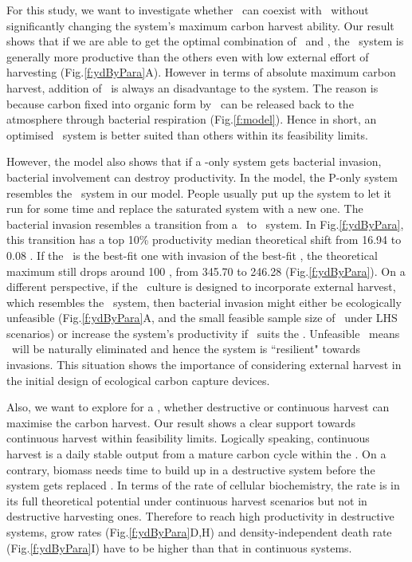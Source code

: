 \documentclass[../thesis.tex]{subfiles} %
\begin{document}
For this study, we want to investigate whether \bac\ can coexist with \phy\ without significantly changing the system’s maximum carbon harvest ability.  Our result shows that if we are able to get the optimal combination of \phy\ and \bac, the \PBH\ system is generally more productive than the others even with low external effort of harvesting (Fig.\ref{f:ydByPara}A).  However in terms of absolute maximum carbon harvest, addition of \bac\ is always an disadvantage to the system.  The reason is because carbon fixed into organic form by \phy\ can be released back to the atmosphere through bacterial respiration (Fig.\ref{f:model}).  Hence in short, an optimised \PBH\ system is better suited than others within its feasibility limits.

However, the model also shows that if a \phy-only system gets bacterial invasion, bacterial involvement can destroy productivity.  In the model, the P-only system resembles the \PoN\ system in our model.  People usually put up the system to let it run for some time and replace the saturated system with a new one.  The bacterial invasion resembles a transition from a \PoN\ to \PBN\ system.  In Fig.\ref{f:ydByPara}, this transition has a top 10\% productivity median theoretical shift from 16.94 to 0.08 \dxdt.  If the \phy\ is the best-fit one with invasion of the best-fit \bac, the theoretical maximum still drops around 100 \dxdt, from 345.70 to 246.28 (Fig.\ref{f:ydByPara}).  On a different perspective, if the \phy\ culture is designed to incorporate external harvest, which resembles the \PoH\ system, then bacterial invasion might either be ecologically unfeasible (Fig.\ref{f:ydByPara}A, and the small feasible sample size of \PBH\ under LHS scenarios) or increase the system’s productivity if \bac\ suits the \phy.  Unfeasible \PBH\ means \bac\ will be naturally eliminated and hence the system is ``resilient" towards invasions.  This situation shows the importance of considering external harvest in the initial design of ecological carbon capture devices.

Also, we want to explore for a \pbs, whether destructive or continuous harvest can maximise the carbon harvest.  Our result shows a clear support towards continuous harvest within feasibility limits.  Logically speaking, continuous harvest is a daily stable output from a mature carbon cycle within the \pbs.  On a contrary, biomass needs time to build up in a destructive system before the system gets replaced \autocite{aytekin2016statistical}.  In terms of the rate of cellular biochemistry, the rate is in its full theoretical potential under continuous harvest scenarios but not in destructive harvesting ones.  Therefore to reach high productivity in destructive systems, grow rates (Fig.\ref{f:ydByPara}D,H) and density-independent death rate (Fig.\ref{f:ydByPara}I) have to be higher than that in continuous systems.
\end{document}
